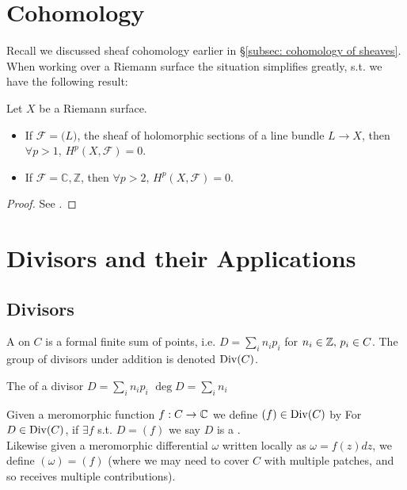 \documentclass{article}
\begin{document}
\section{Cohomology}
Recall we discussed sheaf cohomology earlier in \S \ref{subsec: cohomology of sheaves}. When working over a Riemann surface the situation simplifies greatly, s.t. we have the following result:
\begin{theorem}
	Let $X$ be a Riemann surface. 
	\begin{itemize}
		\item If $\mathcal{F} = \mathcal(L)$, the sheaf of holomorphic sections of a line bundle $L \to X$, then $\forall p>1, \, H^p(X,\mathcal{F})=0$.
		\item If $\mathcal{F} = \mathbb{C},\mathbb{Z}$, then $\forall p>2, \, H^p(X,\mathcal{F})=0$. 
	\end{itemize} 
\end{theorem}
\begin{proof}
	See \cite{Hitchin1999,Gunning1966}.
\end{proof}



\section{Divisors and their Applications}\label{sec: Divisors and their applictions}
\subsection{Divisors}
\begin{definition}
	A  on $C$ is a formal finite sum of points, i.e. $D = \sum_i n_i p_i$ for $n_i \in \mathbb{Z}, \, p_i \in C$. The group of divisors under addition is denoted $\operatorname{Div}(C)$. 
\end{definition}

\begin{definition}
	The  of a divisor $D = \sum_i n_i p_i$ $\deg D = \sum_i n_i $
\end{definition}

\begin{definition}
	Given a meromorphic function $f:C \to \mathbb{C}$ we define $(f) \in \operatorname{Div}(C)$ by 
	For $D \in \operatorname{Div}(C)$, if $\exists f$ s.t. $D=(f)$ we say $D$ is a . \\
	Likewise given a meromorphic differential $\omega$ written locally as $\omega = f(z)dz$, we define $(\omega)=(f)$ (where we may need to cover $C$ with multiple patches, and so receives multiple contributions).  
\end{definition}
\end{document}
